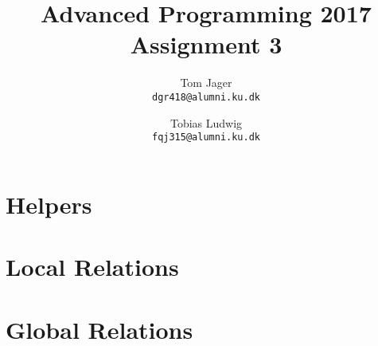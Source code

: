\documentclass{article}
\title{Advanced Programming 2017\\Assignment 3}
\author{
Tom Jager\\
\texttt{dgr418@alumni.ku.dk}
\and
Tobias Ludwig\\
\texttt{fqj315@alumni.ku.dk}}
\begin{document}
\maketitle

\section{Helpers}
\section{Local Relations}
\section{Global Relations}

\end{document}

